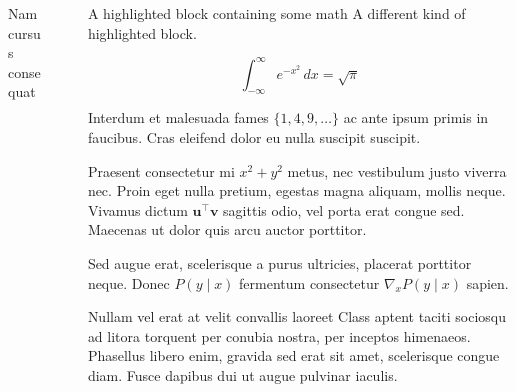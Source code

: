 \documentclass[final]{beamer}
\newlength{\sepwidth}
\newlength{\colwidth}
\newcommand{\separatorcolumn}{\begin{column}{\sepwidth}\end{column}}
\begin{document}
\begin{frame}[t]
\begin{columns}[t]
\begin{column}{\colwidth}
\begin{block}{Nam cursus consequat}
  \end{block}
\end{column}

\separatorcolumn
\begin{column}{\colwidth}

  \begin{exampleblock}{A highlighted block containing some math}
    A different kind of highlighted block.

    $$
    \int_{-\infty}^{\infty} e^{-x^2}\,dx = \sqrt{\pi}
    $$

    Interdum et malesuada fames $\{1, 4, 9, \ldots\}$ ac ante ipsum primis in
    faucibus. Cras eleifend dolor eu nulla suscipit suscipit. 


    Praesent consectetur mi $x^2 + y^2$ metus, nec vestibulum justo viverra
    nec. Proin eget nulla pretium, egestas magna aliquam, mollis neque. Vivamus
    dictum $\mathbf{u}^\intercal\mathbf{v}$ sagittis odio, vel porta erat
    congue sed. Maecenas ut dolor quis arcu auctor porttitor.


    Sed augue erat, scelerisque a purus ultricies, placerat porttitor neque.
    Donec $P(y \mid x)$ fermentum consectetur $\nabla_x P(y \mid x)$ sapien.

  \end{exampleblock}
  
  \begin{block}{Nullam vel erat at velit convallis laoreet}
    Class aptent taciti sociosqu ad litora torquent per conubia nostra, per
    inceptos himenaeos. Phasellus libero enim, gravida sed erat sit amet,
    scelerisque congue diam. Fusce dapibus dui ut augue pulvinar iaculis.


\end{block}
\end{column}
\end{columns}
\end{frame}
\end{document}
